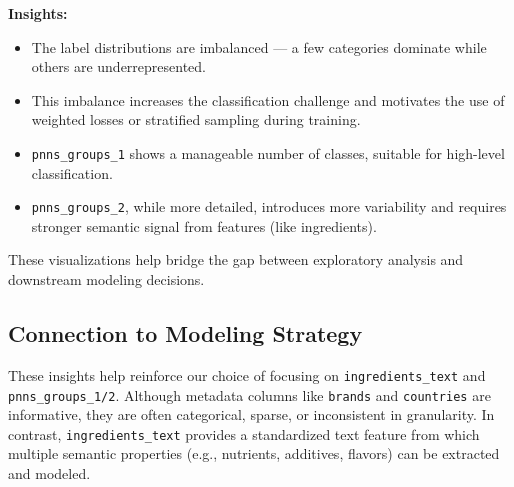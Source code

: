 \documentclass[11pt]{article}
\begin{document}
\textbf{Insights:}
\begin{itemize}
    \item The label distributions are imbalanced — a few categories dominate while others are underrepresented.
    \item This imbalance increases the classification challenge and motivates the use of weighted losses or stratified sampling during training.
    \item \texttt{pnns\_groups\_1} shows a manageable number of classes, suitable for high-level classification.
    \item \texttt{pnns\_groups\_2}, while more detailed, introduces more variability and requires stronger semantic signal from features (like ingredients).
\end{itemize}

These visualizations help bridge the gap between exploratory analysis and downstream modeling decisions.


\subsection{Connection to Modeling Strategy}

These insights help reinforce our choice of focusing on \texttt{ingredients\_text} and \texttt{pnns\_groups\_1/2}. Although metadata columns like \texttt{brands} and \texttt{countries} are informative, they are often categorical, sparse, or inconsistent in granularity. In contrast, \texttt{ingredients\_text} provides a standardized text feature from which multiple semantic properties (e.g., nutrients, additives, flavors) can be extracted and modeled.

\begin{comment}
\subsection{Suggested Further Explorations}

To support the modeling task more directly, we additionally propose:

\begin{itemize}
    \item \textbf{Distribution of tag-based features} (e.g., \texttt{num\_NUT}, \texttt{num\_FLA}) across the dataset.
    \item \textbf{Class imbalance visualization} for \texttt{pnns\_groups\_1} and \texttt{pnns\_groups\_2}.
    \item \textbf{Correlation analysis} between tag counts and predicted classes.
\end{itemize}
\end{comment}
\end{document}
